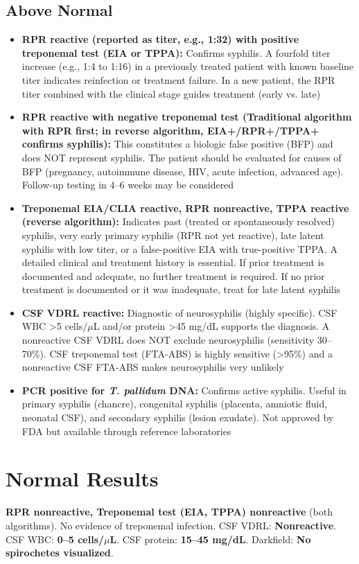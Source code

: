 \subsection*{Above Normal}
\begin{itemize}
  \item \textbf{RPR reactive (reported as titer, e.g., 1:32) with positive treponemal test (EIA or TPPA):} Confirms syphilis. A fourfold titer increase (e.g., 1:4 to 1:16) in a previously treated patient with known baseline titer indicates reinfection or treatment failure. In a new patient, the RPR titer combined with the clinical stage guides treatment (early vs. late)
  \item \textbf{RPR reactive with negative treponemal test (Traditional algorithm with RPR first; in reverse algorithm, EIA+/RPR+/TPPA+ confirms syphilis):} This constitutes a biologic false positive (BFP) and does NOT represent syphilis. The patient should be evaluated for causes of BFP (pregnancy, autoimmune disease, HIV, acute infection, advanced age). Follow-up testing in 4--6 weeks may be considered
  \item \textbf{Treponemal EIA/CLIA reactive, RPR nonreactive, TPPA reactive (reverse algorithm):} Indicates past (treated or spontaneously resolved) syphilis, very early primary syphilis (RPR not yet reactive), late latent syphilis with low titer, or a false-positive EIA with true-positive TPPA. A detailed clinical and treatment history is essential. If prior treatment is documented and adequate, no further treatment is required. If no prior treatment is documented or it was inadequate, treat for late latent syphilis
  \item \textbf{CSF VDRL reactive:} Diagnostic of neurosyphilis (highly specific). CSF WBC >5 cells/$\mu$L and/or protein >45 mg/dL supports the diagnosis. A nonreactive CSF VDRL does NOT exclude neurosyphilis (sensitivity 30--70\%). CSF treponemal test (FTA-ABS) is highly sensitive (>95\%) and a nonreactive CSF FTA-ABS makes neurosyphilis very unlikely
  \item \textbf{PCR positive for \textit{T. pallidum} DNA:} Confirms active syphilis. Useful in primary syphilis (chancre), congenital syphilis (placenta, amniotic fluid, neonatal CSF), and secondary syphilis (lesion exudate). Not approved by FDA but available through reference laboratories
\end{itemize}

\section*{Normal Results}
\textbf{RPR nonreactive, Treponemal test (EIA, TPPA) nonreactive} (both algorithms). No evidence of treponemal infection. CSF VDRL: \textbf{Nonreactive}. CSF WBC: \textbf{0--5 cells/$\mu$L}. CSF protein: \textbf{15--45 mg/dL}. Darkfield: \textbf{No spirochetes visualized}.

